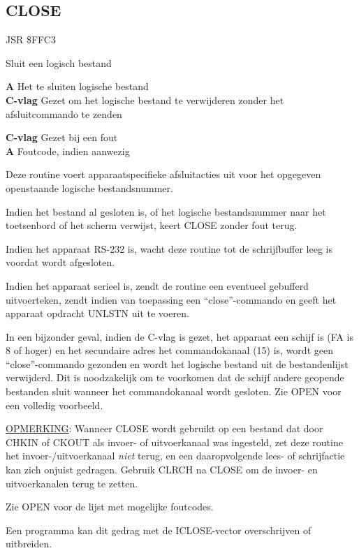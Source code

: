\subsection{CLOSE}
\label{KERNAL Jump Table!CLOSE}
\begin{description}[leftmargin=2cm,style=nextline]
    \item [Adres:] JSR \$FFC3    \item [Omschrijving:] Sluit een logisch bestand    \item [Invoer:]        \textbf{A} Het te sluiten logische bestand \\        \textbf{C-vlag} Gezet om het logische bestand te verwijderen zonder het afsluitcommando te zenden    \item [Uitvoer:]        \textbf{C-vlag} Gezet bij een fout \\        \textbf{A} Foutcode, indien aanwezig    \item [Opmerkingen:]        Deze routine voert apparaatspecifieke afsluitacties uit voor het opgegeven openstaande logische bestandsnummer.

        Indien het bestand al gesloten is, of het logische bestandsnummer naar het toetsenbord of het scherm verwijst, keert CLOSE zonder fout terug.

        Indien het apparaat RS-232 is, wacht deze routine tot de schrijfbuffer leeg is voordat wordt afgesloten.

        Indien het apparaat serieel is, zendt de routine een eventueel gebufferd uitvoerteken, zendt indien van toepassing een ``close''-commando en geeft het apparaat opdracht UNLSTN uit te voeren.

        In een bijzonder geval, indien de C-vlag is gezet, het apparaat een schijf is (FA is 8 of hoger) en het secundaire adres het commandokanaal (15) is, wordt geen ``close''-commando gezonden en wordt het logische bestand uit de bestandenlijst verwijderd. Dit is noodzakelijk om te voorkomen dat de schijf andere geopende bestanden sluit wanneer het commandokanaal wordt gesloten. Zie OPEN voor een volledig voorbeeld.

        \underline{OPMERKING}: Wanneer CLOSE wordt gebruikt op een bestand dat door CHKIN of CKOUT als invoer- of uitvoerkanaal was ingesteld, zet deze routine het invoer-/uitvoerkanaal \emph{niet} terug, en een daaropvolgende lees- of schrijfactie kan zich onjuist gedragen. Gebruik CLRCH na CLOSE om de invoer- en uitvoerkanalen terug te zetten.

        Zie OPEN voor de lijst met mogelijke foutcodes.

        Een programma kan dit gedrag met de ICLOSE-vector overschrijven of uitbreiden.    \item [Voorbeeld:]
\end{description}


